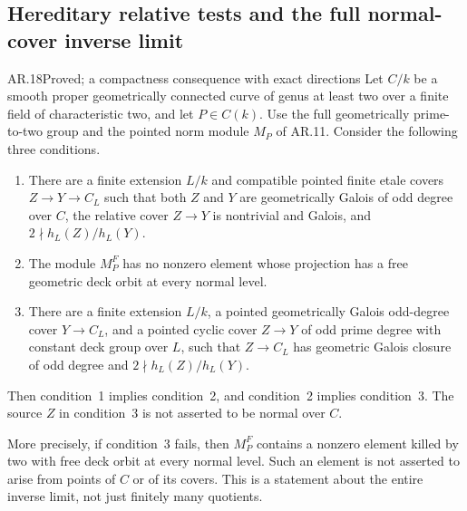 \subsection{Hereditary relative tests and the full normal-cover inverse limit}

\begin{claim}{AR.18}{Proved; a compactness consequence with exact directions}
Let $C/k$ be a smooth proper geometrically connected curve of genus
at least two over a finite field of characteristic two, and let
$P\in C(k)$. Use the full geometrically prime-to-two group and the
pointed norm module $M_P$ of AR.11. Consider the following three
conditions.
\begin{enumerate}
\item There are a finite extension $L/k$ and compatible pointed
finite etale covers $Z\to Y\to C_L$ such that both $Z$ and $Y$
are geometrically Galois of odd degree over $C$, the relative
cover $Z\to Y$ is nontrivial and Galois, and
$2\nmid h_L(Z)/h_L(Y)$.
\item The module $M_P^F$ has no nonzero element whose projection
has a free geometric deck orbit at every normal level.
\item There are a finite extension $L/k$, a pointed geometrically
Galois odd-degree cover $Y\to C_L$, and a pointed cyclic cover
$Z\to Y$ of odd prime degree with constant deck group over $L$,
such that $Z\to C_L$ has geometric Galois closure of odd degree
and $2\nmid h_L(Z)/h_L(Y)$.
\end{enumerate}
Then condition~1 implies condition~2, and condition~2 implies
condition~3. The source $Z$ in condition~3 is not asserted to be
normal over $C$.

More precisely, if condition~3 fails, then $M_P^F$ contains a
nonzero element killed by two with free deck orbit at every
normal level. Such an element is not asserted to arise from
points of $C$ or of its covers. This is a statement about the
entire inverse limit, not just finitely many quotients.
\end{claim}
